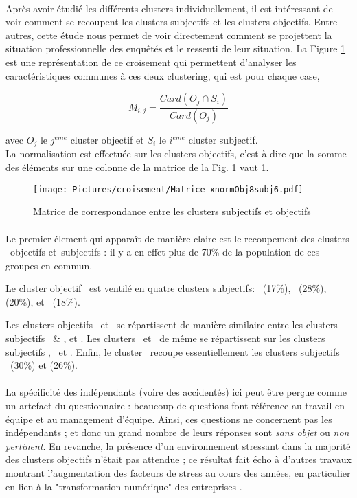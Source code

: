 \documentclass[11pt,fleqn,a4paper,openany,frenchb]{book} %
\begin{document}
\paragraph{}
Après avoir étudié les différents clusters individuellement, il est intéressant de voir comment se recoupent les clusters subjectifs et les clusters objectifs. Entre autres, cette étude nous permet de voir directement comment se projettent la situation professionnelle des enquêtés et le ressenti de leur situation. La Figure \ref{fig:objxsubj} est une représentation de ce croisement qui permettent d'analyser les caractéristiques communes à ces deux clustering, qui est pour chaque case, 

$$M_{i,j} = \frac{Card(O_j \cap S_i)}{Card(O_j)}$$

avec $O_j$ le $j^{eme}$ cluster objectif et $S_i$ le $i^{eme}$ cluster subjectif. \\

La normalisation est effectuée sur les clusters objectifs, c'est-à-dire que la somme des éléments sur une colonne de la matrice de la Fig. \ref{fig:objxsubj} vaut 1.

\begin{figure}[!h]
\center
\texttt{[image: Pictures/croisement/Matrice\_xnormObj8subj6.pdf]}
\caption{Matrice de correspondance entre les clusters subjectifs et objectifs}
\label{fig:objxsubj}
\end{figure} %

\paragraph{}
Le premier élement qui apparaît de manière claire est le recoupement des clusters \INDEP\ objectifs et\INDEP\ subjectifs : il y a en effet plus de 70\% de la population de ces groupes en commun. 

Le cluster objectif \SERV\ est ventilé en quatre clusters subjectifs: \INDEP\ (17\%), \HEUR\ (28\%), \RAS (20\%), et \ENV\ (18\%). 

Les clusters objectifs \OUVR\ et \IMM\ se répartissent de manière similaire entre les clusters subjectifs \HEUR\ \& \RAS, et \ENV. Les clusters \CSPPPr\ et \CSPPPu\ de même se  répartissent sur les clusters subjectifs \RAS, \GLOB\ et \ENV. Enfin, le cluster \ACC\  recoupe 
essentiellement les clusters subjectifs \MALH\ (30\%) et \ENV (26\%).

\paragraph{}
La spécificité des indépendants (voire des accidentés) ici peut être perçue comme un artefact du questionnaire : beaucoup de questions font référence au travail en équipe et au management d'équipe. Ainsi, ces questions ne concernent pas les indépendants ; et donc un grand nombre de leurs réponses sont {\em sans objet} ou {\em non pertinent}. En revanche, la présence d'un environnement stressant dans la majorité des clusters objectifs n'était pas attendue ;  ce résultat fait écho à d'autres travaux montrant l'augmentation des facteurs de stress au cours des années, en particulier en lien à la "transformation numérique" des entreprises \cite{datchary2011dispersion}.
\end{document}
